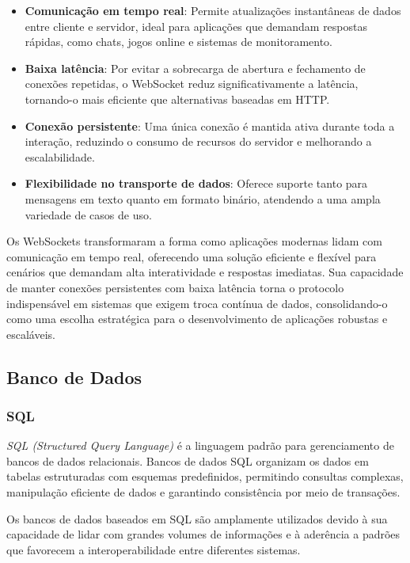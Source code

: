\begin{itemize}
    \item \textbf{Comunicação em tempo real}: Permite atualizações instantâneas de dados entre cliente e servidor, ideal para aplicações que demandam respostas rápidas, como chats, jogos online e sistemas de monitoramento.
    \item \textbf{Baixa latência}: Por evitar a sobrecarga de abertura e fechamento de conexões repetidas, o WebSocket reduz significativamente a latência, tornando-o mais eficiente que alternativas baseadas em HTTP.
    \item \textbf{Conexão persistente}: Uma única conexão é mantida ativa durante toda a interação, reduzindo o consumo de recursos do servidor e melhorando a escalabilidade.
    \item \textbf{Flexibilidade no transporte de dados}: Oferece suporte tanto para mensagens em texto quanto em formato binário, atendendo a uma ampla variedade de casos de uso.
\end{itemize}

Os WebSockets transformaram a forma como aplicações modernas lidam com comunicação em tempo real, oferecendo uma solução eficiente e flexível para cenários que demandam alta interatividade e respostas imediatas. Sua capacidade de manter conexões persistentes com baixa latência torna o protocolo indispensável em sistemas que exigem troca contínua de dados, consolidando-o como uma escolha estratégica para o desenvolvimento de aplicações robustas e escaláveis.

\subsection{Banco de Dados}


\subsubsection{SQL}

\emph{SQL (Structured Query Language)} é a linguagem padrão para gerenciamento de bancos de dados relacionais\cite{sql-wiki}. Bancos de dados SQL organizam os dados em tabelas estruturadas com esquemas predefinidos, permitindo consultas complexas, manipulação eficiente de dados e garantindo consistência por meio de transações.

Os bancos de dados baseados em SQL são amplamente utilizados devido à sua capacidade de lidar com grandes volumes de informações e à aderência a padrões que favorecem a interoperabilidade entre diferentes sistemas.

